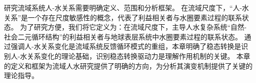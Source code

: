 研究流域系统人-水关系需要明确定义、范围和分析框架。
在流域尺度下，“人-水关系”是一个存在尺度敏感性的概念，代表了利益相关者与水圈要素过程的联系状态。
为了研究方便，我们将它定义为：在流域尺度下，主导人水复杂系统“自然-社会二元循环结构”的利益相关者与地球表层系统中水圈要素过程的联系状态。
通过强调人-水关系变化是流域系统反馈循环模式的重组，本章明确了稳态转换是识别人-水关系变化的理论基础，识别稳态转换驱动力是理解作用机制的关键。
本章的定义和框架为流域人水研究提供了明确的方向，为分析其演变机制提供了关键的理论指导。
